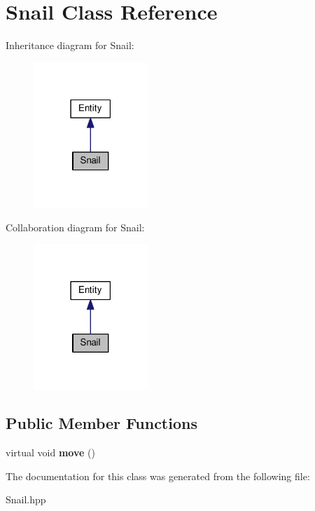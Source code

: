 \hypertarget{classSnail}{}\section{Snail Class Reference}
\label{classSnail}


Inheritance diagram for Snail\+:
\nopagebreak
\begin{figure}[H]
\begin{center}
\leavevmode
\includegraphics[width=122pt]{classSnail__inherit__graph}
\end{center}
\end{figure}


Collaboration diagram for Snail\+:
\nopagebreak
\begin{figure}[H]
\begin{center}
\leavevmode
\includegraphics[width=122pt]{classSnail__coll__graph}
\end{center}
\end{figure}
\subsection*{Public Member Functions}
\begin{DoxyCompactItemize}
\item 
\mbox{\label{classSnail_a47d29cb68815627114634e5f5739a591}} 
virtual void {\bfseries move} ()
\end{DoxyCompactItemize}


The documentation for this class was generated from the following file\+:\begin{DoxyCompactItemize}
\item 
Snail.\+hpp\end{DoxyCompactItemize}
